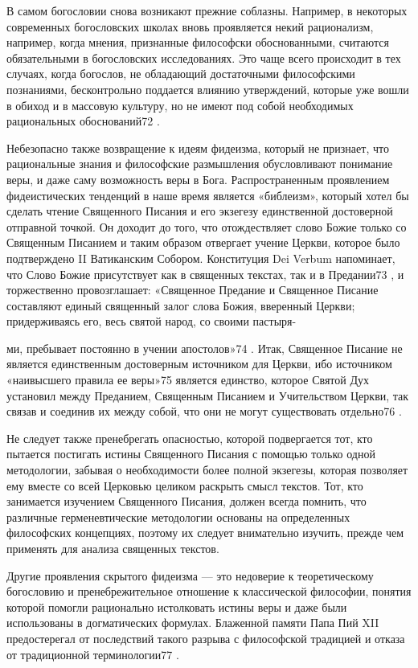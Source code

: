 \documentclass[a5paper,10pt]{article}
\begin{document}
В самом богословии снова возникают прежние соблазны. Например, в некоторых
современных богословских школах вновь проявляется некий рационализм, например,
когда мнения, признанные философски обоснованными, считаются обязательными в
богословских исследованиях. Это чаще всего происходит в тех случаях, когда
богослов, не обладающий достаточными философскими познаниями, бесконтрольно
поддается влиянию утверждений, которые уже вошли в обиход и в массовую
культуру, но не имеют под собой необходимых рациональных обоснований72 .

Небезопасно также возвращение к идеям фидеизма, который не признает, что
рациональные знания и философские размышления обусловливают понимание веры, и
даже саму возможность веры в Бога. Распространенным проявлением фидеистических
тенденций в наше время является «библеизм», который хотел бы сделать чтение
Священного Писания и его экзегезу единственной достоверной отправной точкой. Он
доходит до того, что отождествляет слово Божие только со Священным Писанием и
таким образом отвергает учение Церкви, которое было подтверждено II Ватиканским
Собором. Конституция Dei Verbum напоминает, что Слово Божие присутствует как в
священных текстах, так и в Предании73 , и торжественно провозглашает:
«Священное Предание и Священное Писание составляют единый священный залог слова
Божия, вверенный Церкви; придерживаясь его, весь святой народ, со своими
пастыря-

ми, пребывает постоянно в учении апостолов»74 . Итак, Священное Писание не
является единственным достоверным источником для Церкви, ибо источником
«наивысшего правила ее веры»75 является единство, которое Святой Дух установил
между Преданием, Священным Писанием и Учительством Церкви, так связав и
соединив их между собой, что они не могут существовать отдельно76 .

Не следует также пренебрегать опасностью, которой подвергается тот, кто
пытается постигать истины Священного Писания с помощью только одной
методологии, забывая о необходимости более полной экзегезы, которая позволяет
ему вместе со всей Церковью целиком раскрыть смысл текстов. Тот, кто занимается
изучением Священного Писания, должен всегда помнить, что различные
герменевтические методологии основаны на определенных философских концепциях,
поэтому их следует внимательно изучить, прежде чем применять для анализа
священных текстов.

Другие проявления скрытого фидеизма — это недоверие к теоретическому богословию
и пренебрежительное отношение к классической философии, понятия которой помогли
рационально истолковать истины веры и даже были использованы в догматических
формулах. Блаженной памяти Папа Пий XII предостерегал от последствий такого
разрыва с философской традицией и отказа от традиционной терминологии77 .
\end{document}
